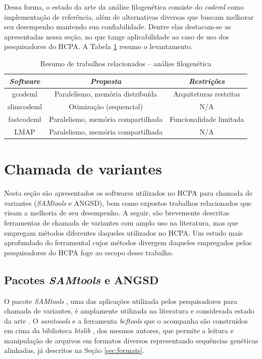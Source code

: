 \documentclass[cic,tc]{iiufrgs}
\begin{document}
Dessa forma, o estado da arte da análise filogenética consiste do \textit{codeml} como
implementação de referência, além de alternativas diversas que buscam melhorar
seu desempenho mantendo sua confiabilidade. Dentre elas destacam-se as
apresentadas nessa seção, no que tange aplicabilidade ao caso de uso dos
pesquisadores do HCPA. A Tabela \ref{tbl:filolit} resumo o levantamento.

\begin{table}[h]
  \caption{Resumo de trabalhos relacionados -- análise filogenética}
    \centering
        \begin{tabular}{c|c|c}
          \hline
          \textit{Software}  & \textit{Proposta} & \textit{Restrições}  \\
          \hline
          \hline
          gcodeml     & Paralelismo, memória distribuída     & Arquiteturas restritas  \\
          slimcodeml  & Otimização (sequencial)              & N/A \\
          fastcodeml  & Paralelismo, memória compartilhada   & Funcionalidade limitada \\
          LMAP        & Paralelismo, memória compartilhada   & N/A \\
          \hline
        \end{tabular}
    \label{tbl:filolit}
\end{table}

\section{Chamada de variantes}
\label{sec:callant}

Nesta seção são apresentados os softwares utilizados no HCPA para
chamada de variantes (\textit{SAMtools} e ANGSD), bem como expostos trabalhos
relacionados que visam a melhoria de seu desempenho. A seguir, são brevemente
descritas ferramentas de chamada de variantes com amplo uso na literatura, mas
que empregam métodos diferentes daqueles utilizados no HCPA. Um estudo mais
aprofundado do ferramental cujos métodos divergem daqueles empregados pelos
pesquisadores do HCPA foge ao escopo desse trabalho.

\subsection{Pacotes \textit{SAMtools} e ANGSD}

O pacote \textit{SAMtools} \cite{li2009sequence}, uma das aplicações utilizada pelos
pesquisadores para chamada de variantes, é amplamente utilizada na literatura
\cite{danecek2021twelve} e considerada estado da arte \cite{yao2020evaluation}.
O \textit{samtoools} e a ferramenta \textit{bcftools} que o acompanha são construídos em cima da
biblioteca \textit{htslib} \cite{bonfield2021htslib}, dos mesmos autores, que permite a
leitura e manipulação de arquivos em formatos diversos representando sequências
genéticas alinhadas, já descritos na Seção \ref{sec:formats}.
\end{document}
